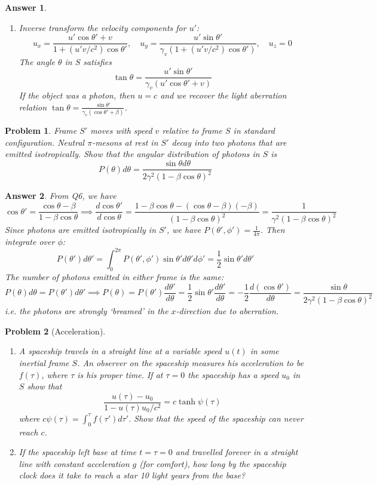 \documentclass[a4paper]{article}
\newtheorem{ans}{Answer}[subsection]
\theoremstyle{new}
\newtheorem{qns}{Problem}[section]
\begin{document}
\begin{ans}
\begin{enumerate}[label=(\alph*)]
The back and the front both moves at speed $v$, as expected. Hence, we must have
$$\tan\theta=\frac{\ell_0\sin\theta'}{\ell_0\cos\theta'/\gamma}=\gamma\tan\theta'$$
\item Inverse transform the velocity components for $u'$:
$$u_x=\frac{u'\cos\theta'+v}{1+(u'v/c^2)\cos\theta'},\quad u_y=\frac{u'\sin\theta'}{\gamma_v(1+(u'v/c^2)\cos\theta')},\quad u_z=0$$
The angle $\theta$ in $S$ satisfies
$$\tan\theta=\frac{u'\sin\theta'}{\gamma_v(u'\cos\theta'+v)}$$
If the object was a photon, then $u=c$ and we recover the light aberration relation $\tan\theta=\frac{\sin\theta'}{\gamma_v(\cos\theta'+\beta)}$.
\end{enumerate}
\end{ans}
\begin{qns}
Frame $S'$ moves with speed $v$ relative to frame $S$ in standard configuration. Neutral $\pi$-mesons at rest in $S'$ decay into two photons that are emitted isotropically. Show that the angular distribution of photons in $S$ is
$$P(\theta)d\theta=\frac{\sin\theta d\theta}{2\gamma^2(1-\beta\cos\theta)^2}$$
\end{qns}
\begin{ans}
From Q6, we have 
$$\cos\theta'=\frac{\cos\theta-\beta}{1-\beta\cos\theta}\implies\frac{d\cos\theta'}{d\cos\theta}=\frac{1-\beta\cos\theta-(\cos\theta-\beta)(-\beta)}{(1-\beta\cos\theta)^2}=\frac{1}{\gamma^2(1-\beta\cos\theta)^2}$$
Since photons are emitted isotropically in $S'$, we have $P(\theta',\phi')=\frac{1}{4\pi}$. Then integrate over $\phi$:
$$P(\theta')d\theta'=\int_0^{2\pi}P(\theta',\phi')\sin\theta'd\theta'd\phi'=\frac{1}{2}\sin\theta'd\theta'$$
The number of photons emitted in either frame is the same:
$$P(\theta)d\theta=P(\theta')d\theta'\implies P(\theta)=P(\theta')\frac{d\theta'}{d\theta}=\frac{1}{2}\sin\theta'\frac{d\theta'}{d\theta}=-\frac{1}{2}\frac{d(\cos\theta')}{d\theta}=\frac{\sin\theta}{2\gamma^2(1-\beta\cos\theta)^2}$$
i.e. the photons are strongly `breamed' in the $x$-direction due to aberration.
\end{ans}
\newpage
\begin{qns}[Acceleration]\leavevmode
\begin{enumerate}[label=(\alph*)]
\item A spaceship travels in a straight line at a variable speed $u(t)$ in some inertial frame $S$. An observer on the spaceship measures his acceleration to be $f(\tau)$, where $\tau$ is his proper time. If at $\tau=0$ the spaceship has a speed $u_0$ in $S$ show that
$$\frac{u(\tau)-u_0}{1-u(\tau)u_0/c^2}=c\tanh\psi(\tau)$$
where $c\psi(\tau)=\int_0^\tau f(\tau')d\tau'$. Show that the speed of the spaceship can never reach $c$.
\item If the spaceship left base at time $t=\tau=0$ and travelled forever in a straight line with constant acceleration $g$ (for comfort), how long by the spaceship clock does it take to reach a star 10 light years from the base?
\end{enumerate}
\end{qns}
\end{document}
